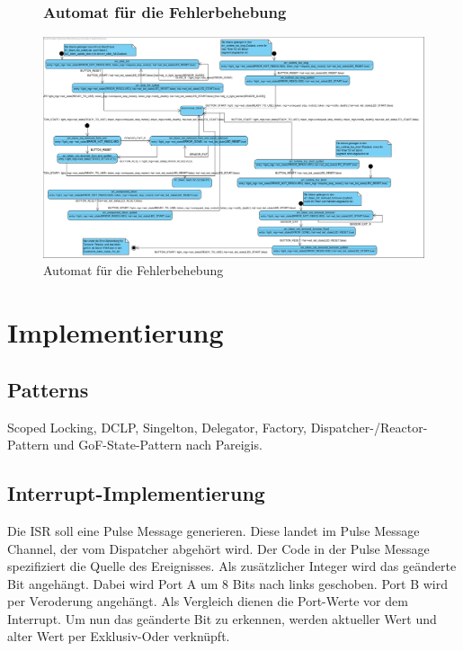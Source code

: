 \documentclass[oneside,a4paper,titlepage]{scrartcl}              %
\begin{document}
\begin{figure}[p]
  \subsubsection{Automat für die Fehlerbehebung}
  \centering\includegraphics[angle=90,scale=0.5]{imgs/Error_FSM.png}
  \caption{Automat für die Fehlerbehebung}
\end{figure}


\section{Implementierung}

\subsection{Patterns}
Scoped Locking, DCLP, Singelton, Delegator, Factory, Dispatcher-/Reactor-Pattern und GoF-State-Pattern nach Pareigis.

\subsection{Interrupt-Implementierung}
Die ISR soll eine Pulse Message generieren. Diese landet im Pulse Message Channel, der vom Dispatcher abgehört wird.
Der Code in der Pulse Message spezifiziert die Quelle des Ereignisses. Als zusätzlicher Integer wird das geänderte Bit angehängt. Dabei wird Port A um 8 Bits nach links geschoben. Port B wird per Veroderung angehängt. Als Vergleich dienen die Port-Werte vor dem Interrupt. Um nun das geänderte Bit zu erkennen, werden aktueller Wert und alter Wert per Exklusiv-Oder verknüpft.
\end{document}
